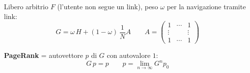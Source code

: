Libero arbitrio $F$ (l'utente non segue un link), peso $\omega$ per la navigazione tramite link:
$$ \boxed{ G = \omega \, H + (1-\omega) \, \frac{1}{N} A } \qquad A = \begin{pmatrix} 1 & \cdots & 1 \\ \vdots & & \vdots \\ 1 & \cdots & 1 \end{pmatrix} $$

\textbf{PageRank} = autovettore $p$ di $G$ con autovalore $1$:
$$ \boxed{ G \, p = p } \qquad p = \lim_{n \to \infty} G^n p_0 $$
